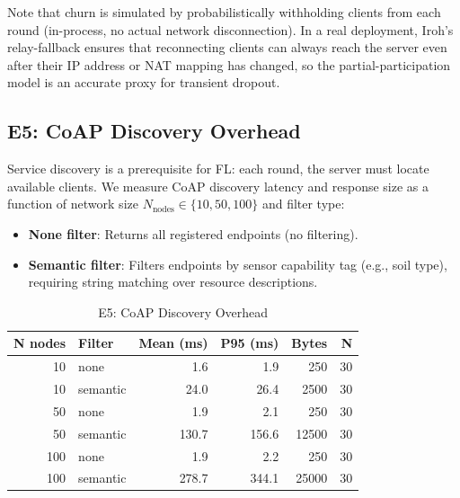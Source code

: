 \documentclass[a4paper,fleqn]{cas-dc}
\begin{document}
Note that churn is simulated by probabilistically withholding clients from each round (in-process, no actual network disconnection). In a real deployment, Iroh's relay-fallback ensures that reconnecting clients can always reach the server even after their IP address or NAT mapping has changed, so the partial-participation model is an accurate proxy for transient dropout.

\subsection{E5: CoAP Discovery Overhead}
\label{sec:e5}

Service discovery is a prerequisite for FL: each round, the server must locate available clients. We measure CoAP discovery latency and response size as a function of network size $N_{\text{nodes}} \in \{10, 50, 100\}$ and filter type:

\begin{itemize}
    \item \textbf{None filter}: Returns all registered endpoints (no filtering).
    \item \textbf{Semantic filter}: Filters endpoints by sensor capability tag (e.g., soil type), requiring string matching over resource descriptions.
\end{itemize}

\begin{table}[t]
\centering
\caption{E5: CoAP Discovery Overhead}
\label{tab:e5}
\scriptsize
\setlength{\tabcolsep}{3.5pt}
\begin{tabular}{r l r r r r}
\toprule
\textbf{N nodes} & \textbf{Filter} & \textbf{Mean (ms)} & \textbf{P95 (ms)} & \textbf{Bytes} & \textbf{N} \\
\midrule
10  & none     & 1.6  & 1.9  & 250   & 30 \\
10  & semantic & 24.0 & 26.4 & 2500  & 30 \\
50  & none     & 1.9  & 2.1  & 250   & 30 \\
50  & semantic & 130.7 & 156.6 & 12500 & 30 \\
100 & none     & 1.9  & 2.2  & 250   & 30 \\
100 & semantic & 278.7 & 344.1 & 25000 & 30 \\
\bottomrule
\end{tabular}
\end{table}
\end{document}
